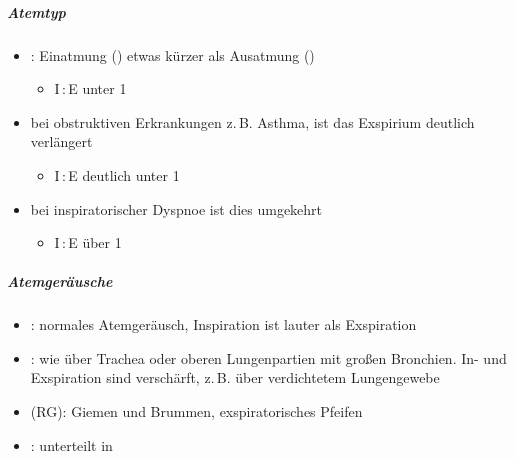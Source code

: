 {\begin{compactitem}
  \item[$\uparrow$] 
  \item[$\downarrow$] 
\end{compactitem}




\subparagraph{Atemtyp}


\begin{itemize}
  \item {}: Einatmung () etwas
  kürzer als Ausatmung ()
  
  \begin{itemize}
    \item I\,:\,E unter 1
  \end{itemize}
  \item bei obstruktiven Erkrankungen z.\,B. Asthma, ist das Exspirium deutlich
  verlängert
  
  \begin{itemize}
    \item {I\,:\,E deutlich unter 1}
  \end{itemize}
  \item {bei inspiratorischer Dyspnoe ist dies umgekehrt}
  
  \begin{itemize}
    \item {I\,:\,E über 1}
  \end{itemize}
\end{itemize}


\subparagraph{Atemgeräusche}


\begin{itemize}
  \item {}: normales Atemgeräusch,
  Inspiration ist lauter als Exspiration
  \item {}: wie über Trachea oder oberen
  Lungenpartien mit großen Bronchien. In- und Exspiration sind
  verschärft, z.\,B. über verdichtetem Lungengewebe
  \item {} (RG): Giemen und
  Brummen, exspiratorisches Pfeifen
  \item {}: unterteilt in
  

\end{itemize}}
